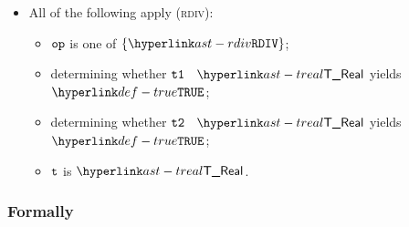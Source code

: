 \begin{itemize}
  \item All of the following apply (\textsc{rdiv}):
  \begin{itemize}
    \item $\op$ is one of $\{\RDIV\}$;
    \item determining whether $\vtone$ \typesatisfies\ $\TReal$ yields $\True$\ProseOrTypeError;
    \item determining whether $\vttwo$ \typesatisfies\ $\TReal$ yields $\True$\ProseOrTypeError;
    \item $\vt$ is $\TReal$.
  \end{itemize}
\end{itemize}



\subsubsection{Formally}
\begin{mathpar}
\end{mathpar}

\begin{mathpar}
\end{mathpar}

